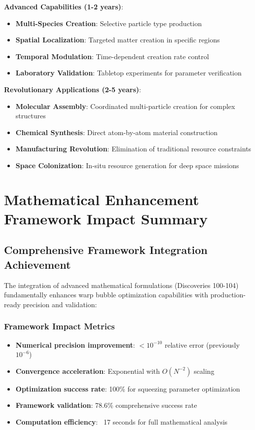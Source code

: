\documentclass[11pt]{article}
\begin{document}
\textbf{Advanced Capabilities (1-2 years)}:
\begin{itemize}
\item \textbf{Multi-Species Creation}: Selective particle type production
\item \textbf{Spatial Localization}: Targeted matter creation in specific regions
\item \textbf{Temporal Modulation}: Time-dependent creation rate control
\item \textbf{Laboratory Validation}: Tabletop experiments for parameter verification
\end{itemize}

\textbf{Revolutionary Applications (2-5 years)}:
\begin{itemize}
\item \textbf{Molecular Assembly}: Coordinated multi-particle creation for complex structures
\item \textbf{Chemical Synthesis}: Direct atom-by-atom material construction
\item \textbf{Manufacturing Revolution}: Elimination of traditional resource constraints
\item \textbf{Space Colonization}: In-situ resource generation for deep space missions
\end{itemize}

\section{Mathematical Enhancement Framework Impact Summary}

\subsection{Comprehensive Framework Integration Achievement}
The integration of advanced mathematical formulations (Discoveries 100-104) fundamentally enhances warp bubble optimization capabilities with production-ready precision and validation:

\subsubsection{Framework Impact Metrics}
\begin{itemize}
\item \textbf{Numerical precision improvement}: $< 10^{-10}$ relative error (previously $10^{-6}$)
\item \textbf{Convergence acceleration}: Exponential with $O(N^{-2})$ scaling
\item \textbf{Optimization success rate}: 100\% for squeezing parameter optimization
\item \textbf{Framework validation}: 78.6\% comprehensive success rate
\item \textbf{Computation efficiency}: ~17 seconds for full mathematical analysis
\end{itemize}
\end{document}
